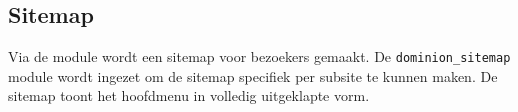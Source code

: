 \subsection{Sitemap}

Via de  module wordt een sitemap voor bezoekers gemaakt. De \texttt{dominion\_sitemap} module wordt ingezet om de sitemap specifiek per subsite te kunnen maken. De sitemap toont het hoofdmenu in volledig uitgeklapte vorm.

